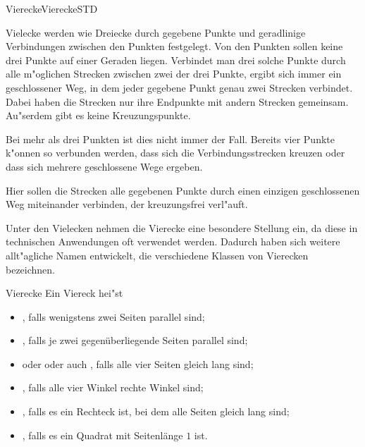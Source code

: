\begin{MXContent}{Vierecke}{Vierecke}{STD}

Vielecke werden wie Dreiecke durch gegebene Punkte und geradlinige Verbindungen
zwischen den Punkten festgelegt. Von den Punkten sollen keine drei Punkte auf
einer Geraden liegen. Verbindet man drei solche Punkte durch alle m"oglichen 
Strecken zwischen zwei der drei Punkte, ergibt sich immer ein geschlossener Weg,
in dem jeder gegebene Punkt genau zwei Strecken verbindet. 
Dabei haben die Strecken nur ihre Endpunkte mit andern Strecken gemeinsam. 
Au"serdem gibt es keine Kreuzungspunkte.

Bei mehr als drei Punkten ist dies nicht immer der Fall. Bereits vier Punkte 
k"onnen so verbunden werden, dass sich die Verbindungsstrecken kreuzen oder 
dass sich mehrere geschlossene Wege ergeben.

Hier sollen die Strecken alle gegebenen Punkte durch einen einzigen 
geschlossenen Weg miteinander verbinden, der kreuzungsfrei verl"auft.

Unter den Vielecken nehmen die Vierecke eine besondere Stellung ein, da 
diese in technischen Anwendungen oft verwendet werden. Dadurch haben sich 
weitere allt"agliche Namen entwickelt, die verschiedene Klassen von Vierecken 
bezeichnen.

\begin{MXInfo}{Vierecke}%
Ein Viereck hei"st
\begin{itemize}
\item {}, falls wenigstens zwei Seiten parallel sind;
\item {}, falls je zwei 
 gegen\"uberliegende Seiten parallel sind;
\item {} oder 
  oder 
 auch , falls alle vier Seiten gleich lang sind;
\item {}, falls alle vier Winkel rechte Winkel sind;
\item {}, falls es ein Rechteck ist, bei dem alle 
 Seiten gleich lang sind;
\item {}, falls es ein Quadrat mit 
 Seitenl\"ange $1$ ist.
\end{itemize}
\end{MXInfo}


\end{MXContent}
